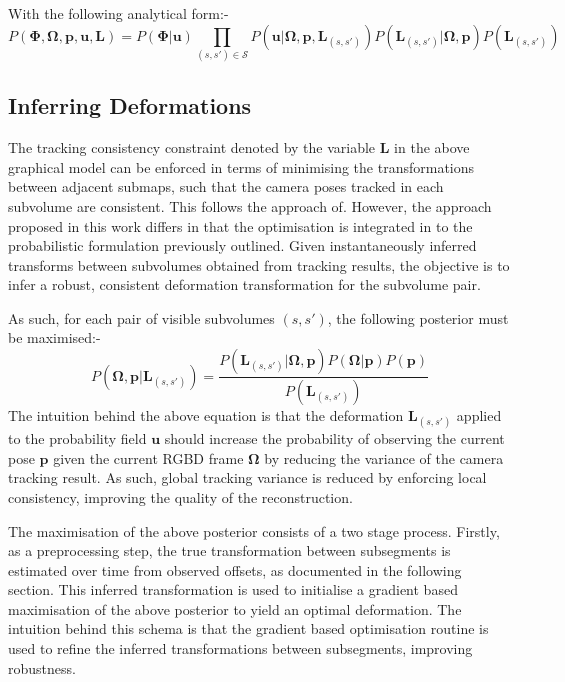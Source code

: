 With the following analytical form:-
\begin{equation}
P(\mathbf{\Phi}, \mathbf{\Omega}, \mathbf{p}, \mathbf{u}, \mathbf{L}) = 
P(\mathbf{\Phi}|\mathbf{u})
\prod_{(s, s') \in \mathcal{S}}P(\mathbf{u}|\mathbf{\Omega}, \mathbf{p}, \mathbf{L}_{(s, s')})
P(\mathbf{L}_{(s, s')}|\mathbf{\Omega}, \mathbf{p})
P(\mathbf{L}_{(s, s')})
\end{equation}

\subsection{Inferring Deformations}
The tracking consistency constraint denoted by the variable $\mathbf{L}$ in the above graphical model can be enforced in terms of minimising the 
transformations between adjacent submaps, such that the camera poses tracked in each subvolume are consistent. This follows the approach 
of\cite{Kahler2016}.  However, the approach proposed in this work differs in that the optimisation is integrated in to the probabilistic 
formulation previously outlined. Given instantaneously inferred transforms between subvolumes obtained from tracking results, 
the objective is to infer a robust, consistent deformation transformation for the subvolume pair.

As such, for each pair of visible subvolumes $(s, s')$, the following posterior must be maximised:-
\begin{equation}
P(\mathbf{\Omega}, \mathbf{p} | \mathbf{L}_{(s, s')}) = \frac{P(\mathbf{L}_{(s, s')} | \mathbf{\Omega}, \mathbf{p}) P(\mathbf{\Omega} | \mathbf{p})P(\mathbf{p})}
{P(\mathbf{L}_{(s, s')})}
\end{equation}
The intuition behind the above equation is that the deformation $\mathbf{L}_{(s, s')}$ applied to the probability field $\mathbf{u}$ should 
increase the probability of observing the current pose $\mathbf{p}$ given the current RGBD frame $\mathbf{\Omega}$ by reducing the 
variance of the camera tracking result. As such, global tracking variance is reduced by enforcing local consistency, improving the quality 
of the reconstruction.

The maximisation of the above posterior consists of a two stage process. Firstly, as a preprocessing step, the true transformation between 
subsegments is estimated over time from observed offsets, as documented in the following section. This inferred transformation is used to 
initialise a gradient based maximisation of the above posterior to yield an optimal deformation. The intuition behind this schema is that the 
gradient based optimisation routine is used to refine the inferred transformations between subsegments, improving robustness.

